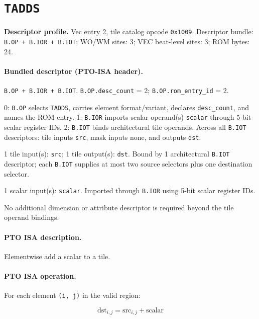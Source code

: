 \section{\texttt{TADDS}}
\noindent\textbf{Descriptor profile.} Vec entry 2, tile catalog opcode \texttt{0x1009}. Descriptor bundle: \texttt{B.OP + B.IOR + B.IOT}; WO/WM sites: 3; VEC beat-level sites: 3; ROM bytes: 24.\par\smallskip
{}
\paragraph{Bundled descriptor (PTO-ISA header).}
\begin{description}[leftmargin=0.18\linewidth,style=nextline]
\item[Bundle] \texttt{B.OP + B.IOR + B.IOT}. \texttt{B.OP.desc\_count} = 2; \texttt{B.OP.rom\_entry\_id} = 2.
\item[Assembly] 0: \texttt{B.OP} selects \texttt{TADDS}, carries element format/variant, declares \texttt{desc\_count}, and names the ROM entry. 1: \texttt{B.IOR} imports scalar operand(s) \texttt{scalar} through 5-bit scalar register IDs. 2: \texttt{B.IOT} binds architectural tile operands. Across all \texttt{B.IOT} descriptors: tile inputs \texttt{src}, mask inputs none, and outputs \texttt{dst}.
\item[Tile operands] 1 tile input(s): \texttt{src}; 1 tile output(s): \texttt{dst}. Bound by 1 architectural \texttt{B.IOT} descriptor; each \texttt{B.IOT} supplies at most two source selectors plus one destination selector.
\item[Scalar GPR operands] 1 scalar input(s): \texttt{scalar}. Imported through \texttt{B.IOR} using 5-bit scalar register IDs.
\item[Metadata operands] No additional dimension or attribute descriptor is required beyond the tile operand bindings.
\end{description}
\par\smallskip
{\small
\paragraph{PTO ISA description.}
Elementwise add a scalar to a tile.
\paragraph{PTO ISA operation.}
For each element \texttt{(i, j)} in the valid region:

\[
\mathrm{dst}_{i,j} = \mathrm{src}_{i,j} + \mathrm{scalar}
\]
}\par\smallskip
